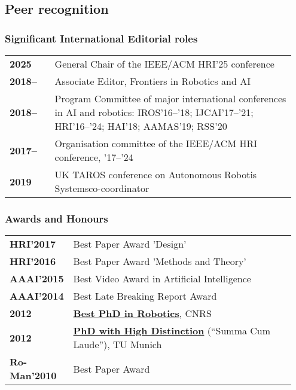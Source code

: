 \subsection{Peer recognition}


\subsubsection{Significant International Editorial roles}

\begin{tabular}{p{0.15\linewidth}p{0.8\linewidth}}
    {\bf 2025} & {General Chair of the IEEE/ACM HRI'25 conference} \\
    {\bf 2018--} & {Associate Editor, Frontiers in Robotics and AI} \\
    {\bf 2018--} & {Program Committee of major international conferences in AI and
    robotics: IROS'16--'18; IJCAI'17--'21; HRI'16--'24; HAI'18; AAMAS'19;
    RSS'20} \\
    {\bf 2017--} & {Organisation committee of the IEEE/ACM HRI conference, '17--'24} \\
    {\bf 2019} & {UK TAROS conference on Autonomous Robotis Systems}{co-coordinator} \\
\end{tabular}


\subsubsection{Awards and Honours}

\begin{tabular}{p{0.15\linewidth}p{0.8\linewidth}}
    {\bf HRI'2017} & {Best Paper Award 'Design'} \\
    {\bf HRI'2016} & {Best Paper Award 'Methods and Theory'} \\
    {\bf AAAI'2015} & {Best Video Award in Artificial Intelligence} \\
    {\bf AAAI'2014} & {Best Late Breaking Report Award} \\
    {\bf 2012} & {\underline{\textbf{Best PhD in Robotics}}, CNRS} \\
    {\bf 2012} & {\underline{\textbf{PhD with High Distinction}} (``Summa Cum
	Laude''), TU Munich} \\
    {\bf Ro-Man'2010} & {Best Paper Award} \\
\end{tabular}

